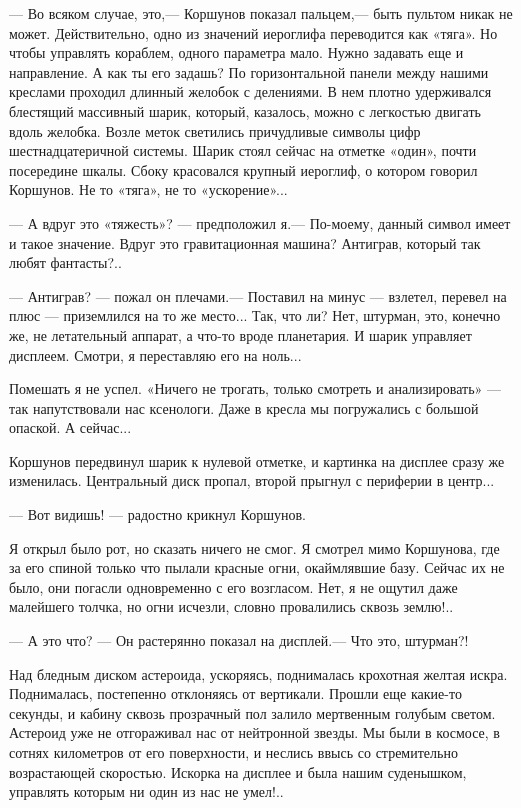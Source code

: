 \documentclass[11pt,a4paper,oneside]{article}
\begin{document}
— Во всяком случае, это,— Коршунов показал пальцем,— быть пультом никак не может. Действительно, одно из значений иероглифа переводится как «тяга». Но чтобы управлять кораблем, одного параметра мало. Нужно задавать еще и направление. А как ты его задашь?
По горизонтальной панели между нашими креслами проходил длинный желобок с делениями. В нем плотно удерживался блестящий массивный шарик, который, казалось, можно с легкостью двигать вдоль желобка. Возле меток светились причудливые символы цифр шестнадцатеричной системы. Шарик стоял сейчас на отметке «один», почти посередине шкалы. Сбоку красовался крупный иероглиф, о котором говорил Коршунов. Не то «тяга», не то «ускорение»...

— А вдруг это «тяжесть»? — предположил я.— По-моему, данный символ имеет и такое значение. Вдруг это гравитационная машина? Антиграв, который так любят фантасты?..

— Антиграв? — пожал он плечами.— Поставил на минус — взлетел, перевел на плюс — приземлился на то же место... Так, что ли? Нет, штурман, это, конечно же, не летательный аппарат, а что-то вроде планетария. И шарик управляет дисплеем. Смотри, я переставляю его на ноль...

Помешать я не успел. «Ничего не трогать, только смотреть и анализировать» — так напутствовали нас ксенологи. Даже в кресла мы погружались с большой опаской. А сейчас...

Коршунов передвинул шарик к нулевой отметке, и картинка на дисплее сразу же изменилась. Центральный диск пропал, второй прыгнул с периферии в центр...

— Вот видишь! — радостно крикнул Коршунов.

Я открыл было рот, но сказать ничего не смог. Я смотрел мимо Коршунова, где за его спиной только что пылали красные огни, окаймлявшие базу. Сейчас их не было, они погасли одновременно с его возгласом. Нет, я не ощутил даже малейшего толчка, но огни исчезли, словно провалились сквозь землю!..

— А это что? — Он растерянно показал на дисплей.— Что это, штурман?!

Над бледным диском астероида, ускоряясь, поднималась крохотная желтая искра. Поднималась, постепенно отклоняясь от вертикали.
Прошли еще какие-то секунды, и кабину сквозь прозрачный пол залило мертвенным голубым светом. Астероид уже не отгораживал нас от нейтронной звезды. Мы были в космосе, в сотнях километров от его поверхности, и неслись ввысь со стремительно возрастающей скоростью. Искорка на дисплее и была нашим суденышком, управлять которым ни один из нас не умел!..
\end{document}
